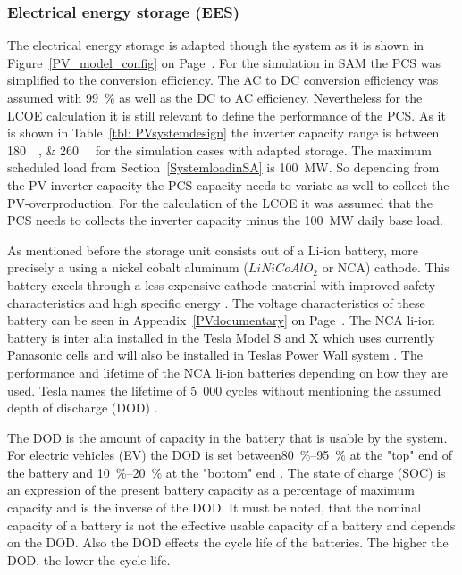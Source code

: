 \subsubsection{Electrical energy storage (EES)}
The electrical energy storage is adapted though the system as it is shown in Figure~\ref{PV_model_config} on Page~\pageref{PV_model_config}. For the simulation in SAM the PCS was simplified to the conversion efficiency. The AC to DC conversion efficiency was assumed with \SI{99}{\percent} as well as the DC to AC efficiency. Nevertheless for the LCOE calculation it is still relevant to define the performance of the PCS. As it is shown in Table~\ref{tbl: PVsystemdesign} the inverter capacity range is between \SIlist{180;260}{\mega\wattsac} for the simulation cases with adapted storage. The maximum scheduled load from Section~\ref{SystemloadinSA} is \SI{100}{\mega\watt}. So depending from the PV inverter capacity the PCS capacity needs to variate as well to collect the  PV-overproduction. For the calculation of the LCOE it was assumed that the PCS needs to collects the inverter capacity minus the \SI{100}{MW} daily base load.

As mentioned before the storage unit consists out of a Li-ion battery, more precisely a using a nickel cobalt aluminum ($LiNiCoAlO_2$  or NCA) cathode. This battery excels through a less expensive cathode material with improved safety characteristics and high specific energy \cite{NREL2015a}. The voltage characteristics of these battery can be seen in Appendix~\ref{PVdocumentary} on Page~\pageref{EES_VoltageDischarge}. The NCA li-ion battery is inter alia installed in the Tesla Model S and X \cite{Nykvist2015} which uses currently Panasonic cells and will also be installed in Teslas Power Wall system \cite{Shahan2015}. The performance and lifetime of the NCA li-ion batteries depending on how they are used. Tesla names the lifetime of 5~000 cycles without mentioning the assumed depth of discharge (DOD) \cite{Shahan2015}.

The DOD is the amount of capacity in the battery that is usable by the system. For electric vehicles (EV) the DOD is set between\SIrange{80}{95}{\percent} at the "top" end of the battery and \SIrange{10}{20}{\percent} at the "bottom" end \cite{Warner2014}. The state of charge (SOC) is an expression of the present battery capacity as a percentage of maximum capacity and is the inverse of the DOD. It must be noted, that the nominal capacity of a battery is not the effective usable capacity of a battery and depends on the DOD. Also the DOD effects the cycle life of the batteries. The higher the DOD, the lower the cycle life.  \cite{MitElectricVehilceTeam2008}

